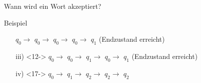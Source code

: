 \begin{frame}{Wann wird ein Wort akzeptiert?}
\begin{alertblock}{Beispiel}
\begin{center}
\begin{enumerate}
                	\alert<7>{$q_0 \rightarrow$} 
	                \alert<8>{$q_0 \rightarrow$} 
	                \alert<9>{$q_0 \rightarrow$} 
	                \alert<10>{$q_0 \rightarrow$} 
	                \alert<11>{$q_1$} (Endzustand erreicht)
                \item[iii)]<12-> 
                	\alert<12>{$q_0 \rightarrow$} 
	                \alert<13>{$q_0 \rightarrow$} 
	                \alert<14>{$q_1 \rightarrow$} 
	                \alert<15>{$q_0 \rightarrow$} 
	              	\alert<16>{$q_1$} (Endzustand erreicht)
                \item[iv)]<17-> 
                	\alert<17>{$q_0 \rightarrow$} 
	                \alert<18>{$q_1 \rightarrow$} 
	                \alert<19>{$q_2 \rightarrow$} 
	                \alert<20>{$q_2 \rightarrow$} 
	                \alert<21>{$q_2$} 
            \end{enumerate}
        \end{center}
    \end{alertblock}
\end{frame}